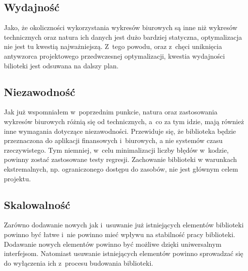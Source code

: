 \subsection{Wydajność}
Jako, że okoliczności wykorzystania wykresów biurowych są inne niż wykresów technicznych oraz natura ich danych jest dużo bardziej statyczna, optymalizacja nie jest tu kwestią najważniejszą. 
Z~tego powodu, oraz z~chęci uniknięcia antywzorca projektowego przedwczesnej optymalizacji, kwestia wydajności bilioteki jest odsuwana na dalszy plan.

\subsection{Niezawodność}
Jak już wspomniałem w~poprzednim punkcie, natura oraz zastosowania wykresów biurowych różnią się od technicznych, a~co za tym idzie, mają również inne wymagania dotyczące niezawodności. Przewiduje się, że biblioteka będzie przeznaczona do aplikacji finansowych i~biurowych, a nie systemów czasu rzeczywistego. Tym niemniej, w~celu minimalizacji liczby błędów w~kodzie, powinny zostać zastosowane testy regresji. Zachowanie biblioteki w warunkach ekstremalnych, np. ograniczonego dostępu do zasobów, nie jest głównym celem projektu.


\subsection{Skalowalność}
Zarówno dodawanie nowych jak i~usuwanie już istniejących elementów biblioteki powinno być łatwe i~nie powinno mieć wpływu na stabilność pracy biblioteki. Dodawanie nowych elementów powinno być możliwe dzięki uniwersalnym interfejsom. Natomiast usuwanie istniejących elementów powinno sprowadzać się do wyłączenia ich z~procesu budowania biblioteki.

